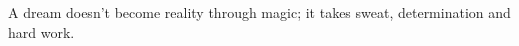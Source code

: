
%





\begin{ntquote}
  A dream doesn't become reality through magic; it takes sweat, determination and hard work.%
\end{ntquote}
